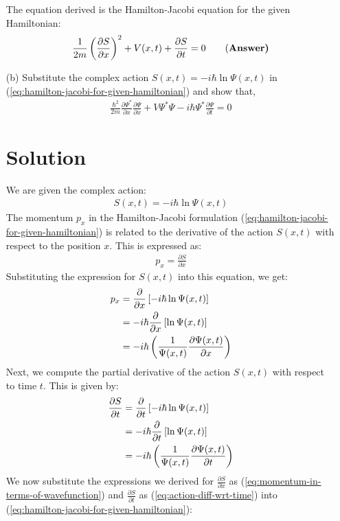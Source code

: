 \begin{enumerate}
    The equation derived is the Hamilton-Jacobi equation for the given Hamiltonian:
    \begin{align}
        \frac{1}{2m} \left(\frac{\partial S}{\partial x}\right)^2 + V(x, t) + \frac{\partial S}{\partial t} = 0\label{eq:hamilton-jacobi-for-given-hamiltonian}\qquad\text{(\bf Answer)}
    \end{align}
    \bigskip\bigskip\hline\hline\bigskip
    \item[(b)] Substitute the complex action $\displaystyle S(x, t) = -i\hbar \ln \Psi(x, t)$ in (\ref{eq:hamilton-jacobi-for-given-hamiltonian}) and show that,
    \begin{align*}
        \frac{\hbar^2}{2m} \frac{\partial \Psi^*}{\partial x} \frac{\partial \Psi}{\partial x} + V\Psi^*\Psi - i\hbar \Psi^* \frac{\partial \Psi}{\partial t} = 0
    \end{align*}
    \bigskip\bigskip\hline\hline\bigskip
    \section*{Solution}
    We are given the complex action:
    \begin{align}
        S(x, t) = -i\hbar \ln \Psi(x, t)
    \end{align}
    The momentum $p_x$ in the Hamilton-Jacobi formulation (\ref{eq:hamilton-jacobi-for-given-hamiltonian}) is related to the derivative of the action $S(x, t)$ with respect to the position $x$. This is expressed as:
    \begin{align}
        p_x = \frac{\partial S}{\partial x}
    \end{align}
    Substituting the expression for $S(x, t)$ into this equation, we get:
    \begin{align}
        p_x &= \frac{\partial}{\partial x} \left[ -i\hbar \ln \Psi(x, t) \right] \notag\\
        &= -i\hbar \frac{\partial}{\partial x} \left[ \ln \Psi(x, t) \right]\notag\\
        &= -i\hbar\left(\frac{1}{\Psi(x, t)} \frac{\partial \Psi(x, t)}{\partial x}\right)\label{eq:momentum-in-terms-of-wavefunction}
    \end{align}
    Next, we compute the partial derivative of the action $S(x, t)$ with respect to time $t$. This is given by:
    \begin{align}
        \frac{\partial S}{\partial t} &= \frac{\partial}{\partial t} \left[ -i\hbar \ln \Psi(x, t) \right] \notag\\
        &= -i\hbar \frac{\partial}{\partial t} \left[ \ln \Psi(x, t) \right] \notag\\
        &= -i\hbar \left(\frac{1}{\Psi(x, t)} \frac{\partial \Psi(x, t)}{\partial t}\right)\label{eq:action-diff-wrt-time}
    \end{align}
    We now substitute the expressions we derived for $\displaystyle\frac{\partial S}{\partial x}$ as (\ref{eq:momentum-in-terms-of-wavefunction}) and $\displaystyle\frac{\partial S}{\partial t}$ as (\ref{eq:action-diff-wrt-time}) into (\ref{eq:hamilton-jacobi-for-given-hamiltonian}):
    

\end{enumerate}
